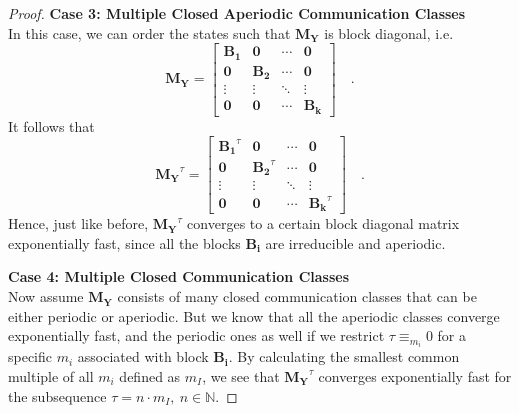 \documentclass[../../main.tex]{subfiles}
\begin{document}
\begin{proof}
        \textbf{Case 3: Multiple Closed Aperiodic Communication Classes} \\
        In this case, we can order the states such that $\bm{M_Y}$ is block diagonal, i.e.
        \[
            \bm{M_Y} = 
            \begin{bmatrix}
            \bm{B_1} & \bm{0} & \cdots & \bm{0} \\
            \bm{0} & \bm{B_2} & \cdots & \bm{0} \\
            \vdots & \vdots & \ddots & \vdots \\
            \bm{0} & \bm{0} & \cdots & \bm{B_k}
            \end{bmatrix}
            \quad .
        \]
        It follows that
        \[
            \bm{M_Y}^\tau = 
            \begin{bmatrix}
            \bm{B_1}^\tau & \bm{0} & \cdots & \bm{0} \\
            \bm{0} & \bm{B_2}^\tau & \cdots & \bm{0} \\
            \vdots & \vdots & \ddots & \vdots \\
            \bm{0} & \bm{0} & \cdots & \bm{B_k}^\tau
            \end{bmatrix}
            \quad .
        \]
        Hence, just like before, $\bm{M_Y}^\tau$ converges to a certain block diagonal matrix exponentially fast, since all the blocks $\bm{B_i}$ are irreducible and aperiodic.

        \textbf{Case 4: Multiple Closed Communication Classes} \\
        Now assume $\bm{M_Y}$ consists of many closed communication classes that can be either periodic or aperiodic. But we know that all the aperiodic classes converge exponentially fast, and the periodic ones as well if we restrict $\tau \equiv_{m_i} 0$ for a specific $m_i$ associated with block $\bm{B_i}$. By calculating the smallest common multiple of all $m_i$ defined as $m_I$, we see that $\bm{M_Y}^\tau$ converges exponentially fast for the subsequence $\tau = n \cdot m_I, \ n \in \mathbb{N}$.


\end{proof}
\end{document}
